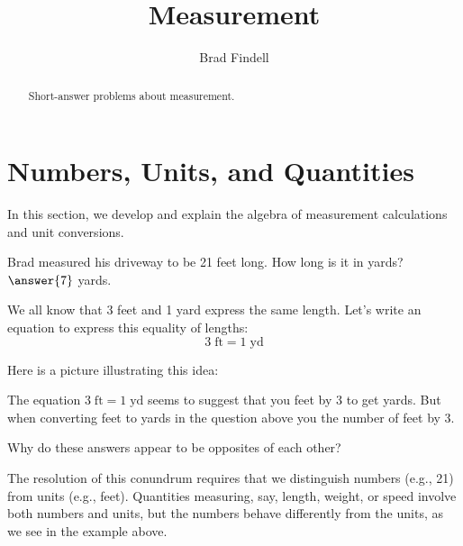 \documentclass[nooutcomes]{ximera}
\title{Measurement}
\author{Brad Findell}
\begin{document}
\begin{abstract}
Short-answer problems about measurement. 
\end{abstract}
\maketitle




\section{Numbers, Units, and Quantities}
In this section, we develop and explain the algebra of measurement calculations and unit conversions. 

\begin{question}
Brad measured his driveway to be 21 feet long.  How long is it in yards?  
$\answer{7}$ yards.  
\end{question}

We all know that 3 feet and 1 yard express the same length.  Let's write an equation to express this equality of lengths: 
\[
3\;\textrm{ft} = 1\;\textrm{yd}
\]

Here is a picture illustrating this idea:  

\begin{image}
\end{image}

\begin{question}
The equation $3\;\textrm{ft} = 1\;\textrm{yd}$ seems to suggest that you  feet by 3 to get yards.  But when converting feet to yards in the question above you  the number of feet by 3.  

Why do these answers appear to be opposites of each other?  
\end{question}

The resolution of this conundrum requires that we distinguish numbers (e.g., 21) from units (e.g., feet).  Quantities measuring, say, length, weight, or speed involve both numbers and units, but the numbers behave differently from the units, as we see in the example above.  
\end{document}
